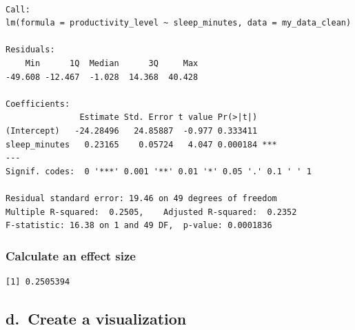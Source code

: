 \documentclass[
  letterpaper,
  DIV=11,
  numbers=noendperiod]{scrartcl}
\newenvironment{Shaded}{\begin{snugshade}}{\end{snugshade}}
\newcommand{\CommentTok}[1]{\textcolor[rgb]{0.37,0.37,0.37}{#1}}
\newcommand{\FunctionTok}[1]{\textcolor[rgb]{0.28,0.35,0.67}{#1}}
\newcommand{\NormalTok}[1]{\textcolor[rgb]{0.00,0.23,0.31}{#1}}
\newcommand{\SpecialCharTok}[1]{\textcolor[rgb]{0.37,0.37,0.37}{#1}}
\begin{document}
\begin{verbatim}

Call:
lm(formula = productivity_level ~ sleep_minutes, data = my_data_clean)

Residuals:
    Min      1Q  Median      3Q     Max 
-49.608 -12.467  -1.028  14.368  40.428 

Coefficients:
               Estimate Std. Error t value Pr(>|t|)    
(Intercept)   -24.28496   24.85887  -0.977 0.333411    
sleep_minutes   0.23165    0.05724   4.047 0.000184 ***
---
Signif. codes:  0 '***' 0.001 '**' 0.01 '*' 0.05 '.' 0.1 ' ' 1

Residual standard error: 19.46 on 49 degrees of freedom
Multiple R-squared:  0.2505,    Adjusted R-squared:  0.2352 
F-statistic: 16.38 on 1 and 49 DF,  p-value: 0.0001836
\end{verbatim}

\subsubsection{Calculate an effect size}\label{calculate-an-effect-size}

\begin{Shaded}
\end{Shaded}

\begin{verbatim}
[1] 0.2505394
\end{verbatim}

\subsection{d.~Create a visualization}\label{d.-create-a-visualization}
\end{document}
